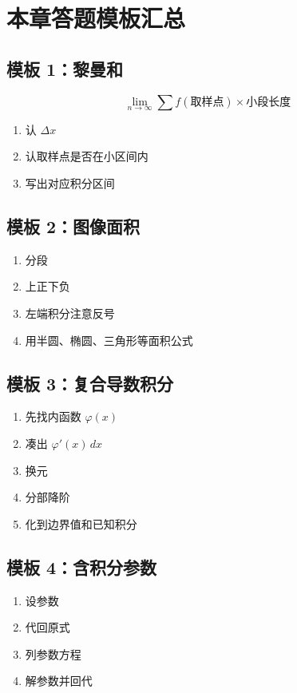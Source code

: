 \documentclass[12pt,a4paper]{ctexart}
\begin{document}
\section{本章答题模板汇总}

\subsection*{模板 1：黎曼和}
\[
\lim_{n\to\infty}\sum f(\text{取样点})\times \text{小段长度}
\]
\begin{enumerate}
  \item 认 $\Delta x$
  \item 认取样点是否在小区间内
  \item 写出对应积分区间
\end{enumerate}

\subsection*{模板 2：图像面积}
\begin{enumerate}
  \item 分段
  \item 上正下负
  \item 左端积分注意反号
  \item 用半圆、椭圆、三角形等面积公式
\end{enumerate}

\subsection*{模板 3：复合导数积分}
\begin{enumerate}
  \item 先找内函数 $\varphi(x)$
  \item 凑出 $\varphi'(x)\,dx$
  \item 换元
  \item 分部降阶
  \item 化到边界值和已知积分
\end{enumerate}

\subsection*{模板 4：含积分参数}
\begin{enumerate}
  \item 设参数
  \item 代回原式
  \item 列参数方程
  \item 解参数并回代
\end{enumerate}
\end{document}
